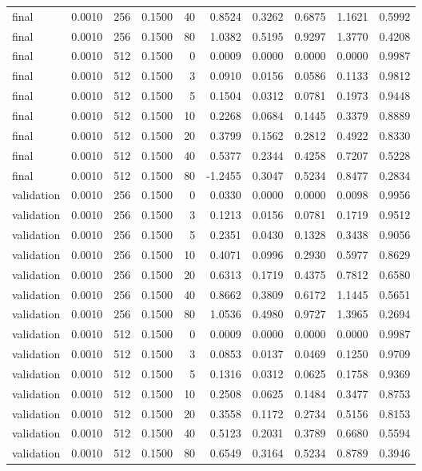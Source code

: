 \begin{tabular}{lrrrrrrrrr}
final & 0.0010 & 256 & 0.1500 & 40 & 0.8524 & 0.3262 & 0.6875 & 1.1621 & 0.5992 \\
final & 0.0010 & 256 & 0.1500 & 80 & 1.0382 & 0.5195 & 0.9297 & 1.3770 & 0.4208 \\
final & 0.0010 & 512 & 0.1500 & 0 & 0.0009 & 0.0000 & 0.0000 & 0.0000 & 0.9987 \\
final & 0.0010 & 512 & 0.1500 & 3 & 0.0910 & 0.0156 & 0.0586 & 0.1133 & 0.9812 \\
final & 0.0010 & 512 & 0.1500 & 5 & 0.1504 & 0.0312 & 0.0781 & 0.1973 & 0.9448 \\
final & 0.0010 & 512 & 0.1500 & 10 & 0.2268 & 0.0684 & 0.1445 & 0.3379 & 0.8889 \\
final & 0.0010 & 512 & 0.1500 & 20 & 0.3799 & 0.1562 & 0.2812 & 0.4922 & 0.8330 \\
final & 0.0010 & 512 & 0.1500 & 40 & 0.5377 & 0.2344 & 0.4258 & 0.7207 & 0.5228 \\
final & 0.0010 & 512 & 0.1500 & 80 & -1.2455 & 0.3047 & 0.5234 & 0.8477 & 0.2834 \\
validation & 0.0010 & 256 & 0.1500 & 0 & 0.0330 & 0.0000 & 0.0000 & 0.0098 & 0.9956 \\
validation & 0.0010 & 256 & 0.1500 & 3 & 0.1213 & 0.0156 & 0.0781 & 0.1719 & 0.9512 \\
validation & 0.0010 & 256 & 0.1500 & 5 & 0.2351 & 0.0430 & 0.1328 & 0.3438 & 0.9056 \\
validation & 0.0010 & 256 & 0.1500 & 10 & 0.4071 & 0.0996 & 0.2930 & 0.5977 & 0.8629 \\
validation & 0.0010 & 256 & 0.1500 & 20 & 0.6313 & 0.1719 & 0.4375 & 0.7812 & 0.6580 \\
validation & 0.0010 & 256 & 0.1500 & 40 & 0.8662 & 0.3809 & 0.6172 & 1.1445 & 0.5651 \\
validation & 0.0010 & 256 & 0.1500 & 80 & 1.0536 & 0.4980 & 0.9727 & 1.3965 & 0.2694 \\
validation & 0.0010 & 512 & 0.1500 & 0 & 0.0009 & 0.0000 & 0.0000 & 0.0000 & 0.9987 \\
validation & 0.0010 & 512 & 0.1500 & 3 & 0.0853 & 0.0137 & 0.0469 & 0.1250 & 0.9709 \\
validation & 0.0010 & 512 & 0.1500 & 5 & 0.1316 & 0.0312 & 0.0625 & 0.1758 & 0.9369 \\
validation & 0.0010 & 512 & 0.1500 & 10 & 0.2508 & 0.0625 & 0.1484 & 0.3477 & 0.8753 \\
validation & 0.0010 & 512 & 0.1500 & 20 & 0.3558 & 0.1172 & 0.2734 & 0.5156 & 0.8153 \\
validation & 0.0010 & 512 & 0.1500 & 40 & 0.5123 & 0.2031 & 0.3789 & 0.6680 & 0.5594 \\
validation & 0.0010 & 512 & 0.1500 & 80 & 0.6549 & 0.3164 & 0.5234 & 0.8789 & 0.3946 \\
\bottomrule
\end{tabular}

